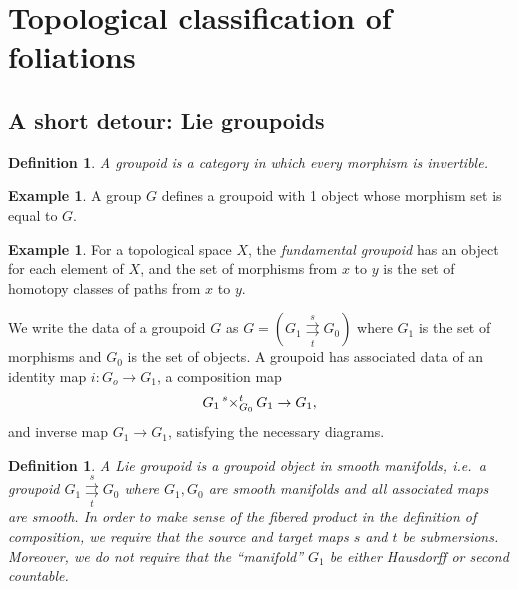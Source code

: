 \documentclass{article}
\newtheorem{definition}[theorem]{Definition}
\newtheorem{proposed work}[theorem]{Proposed Work}
\theoremstyle{definition}
\newtheorem{examplenonit}[theorem]{Example}
\begin{document}
\section{Topological classification of foliations}


\subsection{A short detour: Lie groupoids}
\begin{definition}
  A {\em groupoid} is a category in which every morphism is
  invertible.
\end{definition}

\begin{examplenonit}
  A group $G$ defines a groupoid with 1 object whose morphism set is
  equal to $G$.
\end{examplenonit}

\begin{examplenonit}
  For a topological space $X$, the {\em fundamental groupoid}
  has an object for each element of $X$, and the set of morphisms from
  $x$ to $y$ is the set of homotopy classes of paths from $x$ to $y$.
\end{examplenonit}

We write the data of a groupoid $G$ as
$G = \left( G_1 \underset{t}{\overset{s}{\rightrightarrows}} G_0 \right)$ 
where $G_1$ is the set of morphisms and $G_0$ is the set of objects. A
groupoid has associated data of an identity map $i: G_o \to G_1$, a
composition map 
\[G_1 \sideset{^s}{^t_{G_0}}{\operatorname \times} G_1 \to G_1,\] and inverse map
$G_1 \to G_1$, satisfying the necessary diagrams.

\begin{definition}
  A {\em Lie groupoid} is a groupoid object in smooth manifolds,
  i.e.\ a groupoid $G_1 \underset{t}{\overset{s}{\rightrightarrows}} G_0$
  where $G_1, G_0$ are smooth manifolds and all associated maps are
  smooth. In order to make sense of the fibered product in the
  definition of composition, we require that the source and target maps
  $s$ and $t$ be submersions. Moreover, we do not require that the
  ``manifold'' $G_1$ be either Hausdorff or second countable.
\end{definition}
\end{document}
